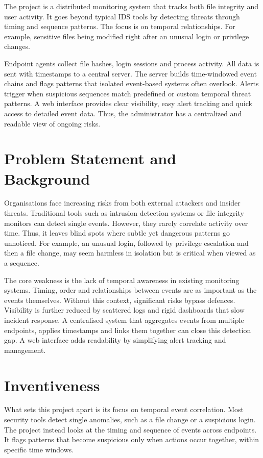 \documentclass[conference]{IEEEtran}
\begin{document}
The project is a distributed monitoring system that tracks both file integrity and user activity. It goes beyond typical IDS tools by detecting threats through timing and sequence patterns. The focus is on temporal relationships. For example, sensitive files being modified right after an unusual login or privilege changes.

Endpoint agents collect file hashes, login sessions and process activity. All data is sent with timestamps to a central server. The server builds time-windowed event chains and flags patterns that isolated event-based systems often overlook. Alerts trigger when suspicious sequences match predefined or custom temporal threat patterns. A web interface provides clear visibility, easy alert tracking and quick access to detailed event data. Thus, the administrator has a centralized and readable view of ongoing risks.

\section{Problem Statement and Background}
Organisations face increasing risks from both external attackers and insider threats. Traditional tools such as intrusion detection systems or file integrity monitors can detect single events. However, they rarely correlate activity over time. Thus, it leaves blind spots where subtle yet dangerous patterns go unnoticed. For example, an unusual login, followed by privilege escalation and then a file change, may seem harmless in isolation but is critical when viewed as a sequence.

The core weakness is the lack of temporal awareness in existing monitoring systems. Timing, order and relationships between events are as important as the events themselves. Without this context, significant risks bypass defences. Visibility is further reduced by scattered logs and rigid dashboards that slow incident response. A centralised system that aggregates events from multiple endpoints, applies timestamps and links them together can close this detection gap. A web interface adds readability by simplifying alert tracking and management.

\section{Inventiveness}

What sets this project apart is its focus on temporal event correlation. Most security tools detect single anomalies, such as a file change or a suspicious login. The project instead looks at the timing and sequence of events across endpoints. It flags patterns that become suspicious only when actions occur together, within specific time windows.
\end{document}

